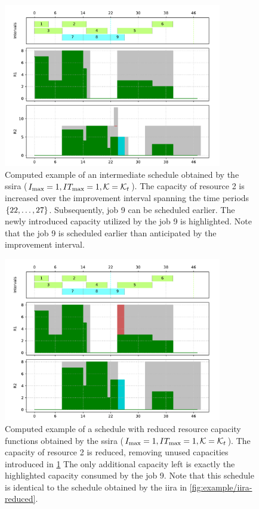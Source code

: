 \begin{figure}[p]
    \centering
    \includegraphics[width=0.85\textwidth]{img/example_solution_ssira_intermediate.pdf}
    \caption{
        Computed example of an intermediate schedule obtained by the \ac{ssira}
        ($I_{\max} = 1, IT_{\max} = 1, \mathcal{K} = \mathcal{K}_{t}$).
        The capacity of resource 2 is increased over the improvement interval
        spanning the time periods $\{{22}, \dots, {27}\}$.
        Subsequently, job 9 can be scheduled earlier.
        The newly introduced capacity utilized by the job 9 is highlighted.
        Note that the job 9 is scheduled earlier than anticipated by the improvement interval.
    }
    \label{fig:example/ssira-step}
\end{figure}

\begin{figure}[p]
    \centering
    \includegraphics[width=0.85\textwidth]{img/example_solution_ssira.pdf}
    \caption{
        Computed example of a schedule with reduced resource capacity functions obtained by the \ac{ssira}
        ($I_{\max} = 1, IT_{\max} = 1, \mathcal{K} = \mathcal{K}_{t}$).
        The capacity of resource 2 is reduced,
        removing unused capacities introduced in \cref{fig:example/ssira-step}
        The only additional capacity left is exactly the highlighted capacity consumed by the job 9.
        Note that this schedule is identical to the schedule obtained by the \ac{iira} in \cref{fig:example/iira-reduced}.
    }
    \label{fig:example/ssira-reduced}
\end{figure}

